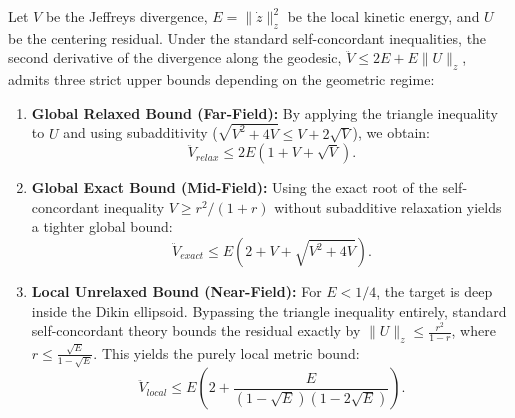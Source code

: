 \begin{lemma}
\label{lem:curvature_bounds}
Let $V$ be the Jeffreys divergence, $E = \|\dot{z}\|_z^2$ be the local kinetic energy, and $U$ be the centering residual. Under the standard self-concordant inequalities, the second derivative of the divergence along the geodesic, $\ddot{V} \le 2E + E\|U\|_z$, admits three strict upper bounds depending on the geometric regime:

\begin{enumerate}
    \item \textbf{Global Relaxed Bound (Far-Field):} By applying the triangle inequality to $U$ and using subadditivity ($\sqrt{V^2+4V} \le V+2\sqrt{V}$), we obtain:
    \begin{equation}
        \ddot{V}_{relax} \le 2E(1 + V + \sqrt{V}).
    \end{equation}
    
    \item \textbf{Global Exact Bound (Mid-Field):} Using the exact root of the self-concordant inequality $V \ge r^2/(1+r)$ without subadditive relaxation yields a tighter global bound:
    \begin{equation}
        \ddot{V}_{exact} \le E\left( 2 + V + \sqrt{V^2 + 4V} \right).
    \end{equation}
    
    \item \textbf{Local Unrelaxed Bound (Near-Field):} For $E < 1/4$, the target is deep inside the Dikin ellipsoid. Bypassing the triangle inequality entirely, standard self-concordant theory bounds the residual exactly by $\|U\|_z \le \frac{r^2}{1-r}$, where $r \le \frac{\sqrt{E}}{1-\sqrt{E}}$. This yields the purely local metric bound:
    \begin{equation}
        \ddot{V}_{local} \le E \left( 2 + \frac{E}{(1-\sqrt{E})(1-2\sqrt{E})} \right).
    \end{equation}
\end{enumerate}
\end{lemma}









